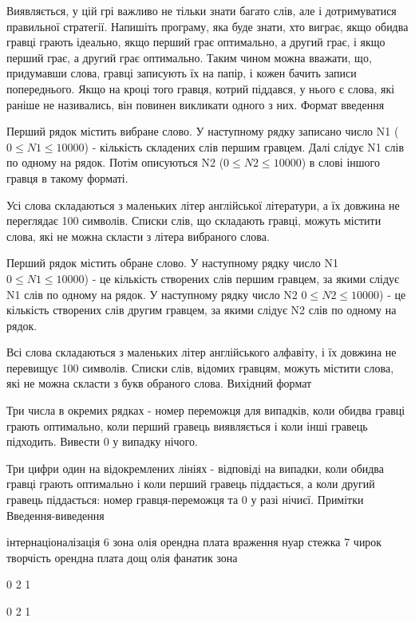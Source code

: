 \documentclass[]{article}
\begin{document}
Виявляється, у цій грі важливо не тільки знати багато слів, але і дотримуватися правильної стратегії. Напишіть програму, яка буде знати, хто виграє, якщо обидва гравці грають ідеально, якщо перший грає оптимально, а другий грає, і якщо перший грає, а другий грає оптимально. Таким чином можна вважати, що, придумавши слова, гравці записують їх на папір, і кожен бачить записи попереднього. Якщо на кроці того гравця, котрий піддався, у нього є слова, які раніше не називались, він повинен викликати одного з них.
Формат введення

Перший рядок містить вибране слово. У наступному рядку записано число N1 ($0 \le N1 \le 10000$) - кількість складених слів першим гравцем. Далі слідує N1 слів по одному на рядок. Потім описуються N2 ($0 \le N2 \le 10000$) в слові іншого гравця в такому форматі.

Усі слова складаються з маленьких літер англійської літератури, а їх довжина не переглядає 100 символів. Списки слів, що складають гравці, можуть містити слова, які не можна скласти з літера вибраного слова.

Перший рядок містить обране слово. У наступному рядку число N1 $0 \le N1 \le 10000$) - це кількість створених слів першим гравцем, за якими слідує N1 слів по одному на рядок. У наступному рядку число N2 $0 \le N2 \le 10000$) - це кількість створених слів другим гравцем, за якими слідує N2 слів по одному на рядок.

Всі слова складаються з маленьких літер англійського алфавіту, і їх довжина не перевищує 100 символів. Списки слів, відомих гравцям, можуть містити слова, які не можна скласти з букв обраного слова.
Вихідний формат

Три числа в окремих рядках - номер переможця для випадків, коли обидва гравці грають оптимально, коли перший гравець виявляється і коли інші гравець підходить. Вивести 0 у випадку нічого.

Три цифри один на відокремлених лініях - відповіді на випадки, коли обидва гравці грають оптимально і коли перший гравець піддається, а коли другий гравець піддається: номер гравця-переможця та 0 у разі нічиєї.
Примітки
Введення-виведення

інтернаціоналізація
6
зона
олія
орендна плата
враження
нуар
стежка
7
чирок
творчість
орендна плата
дощ
олія
фанатик
зона



0
2
1




0
2
1
\end{document}
